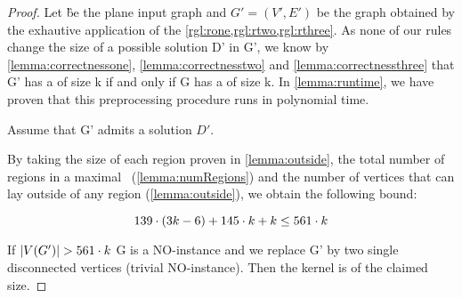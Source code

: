 \begin{proof}
    Let \G be the plane input graph and $G'=(V',E')$ be the graph obtained by the exhautive application of the \cref{rgl:rone,rgl:rtwo,rgl:rthree}. 
    As none of our rules change the size of a possible solution D' in G', we know by \cref{lemma:correctnessone}, \cref{lemma:correctnesstwo} and \cref{lemma:correctnessthree} that G' has a \sdom of size k if and only if G has a \sdom of size k.
    In \cref{lemma:runtime}, we have proven that this preprocessing procedure runs in polynomial time.
    
    \noindent Assume that G' admits a solution $D'$. 
    
    
    By taking the size of each region proven in \cref{lemma:outside}, the total number of regions in a maximal \dreg~(\cref{lemma:numRegions}) and the number of vertices that can lay outside of any region (\cref{lemma:outside}), we obtain the following bound:
    
    \begin{equation}
        139 \cdot (3k - 6) + 145 \cdot k + k \leq 561 \cdot k
    \end{equation}

    \noindent If $\abs{V(G')} > 561 \cdot k$ G is a NO-instance and we replace G' by two single disconnected vertices (trivial NO-instance). Then the kernel is of the claimed size.

\end{proof}